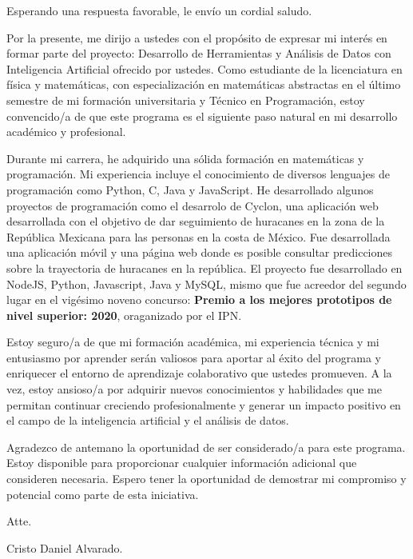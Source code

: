 \documentclass[11pt,a4paper,sans]{moderncv}        %
\begin{document}
\date{1 de enero de 2025}
\opening{}
\closing{Esperando una respuesta favorable, le envío un cordial saludo.}

\makelettertitle

\justifying

Por la presente, me dirijo a ustedes con el propósito de expresar mi interés en formar parte del proyecto: Desarrollo de Herramientas y Análisis de Datos con Inteligencia Artificial ofrecido por ustedes. Como estudiante de la licenciatura en física y matemáticas, con especialización en matemáticas abstractas en el último semestre de mi formación universitaria y Técnico en Programación, estoy convencido/a de que este programa es el siguiente paso natural en mi desarrollo académico y profesional.

Durante mi carrera, he adquirido una sólida formación en matemáticas y programación. Mi experiencia incluye el conocimiento de diversos lenguajes de programación como Python, C, Java y JavaScript. He desarrollado algunos proyectos de programación como el desarrolo de Cyclon, una aplicación web desarrollada con el objetivo de dar seguimiento de huracanes en la zona de la República Mexicana para las personas en la costa de México. Fue desarrollada una aplicación móvil y una página web donde es posible consultar predicciones sobre la trayectoria de huracanes en la república. El proyecto fue
desarrollado en NodeJS, Python, Javascript, Java y MySQL, mismo que fue acreedor del segundo lugar en el vigésimo noveno concurso: \textbf{Premio a los mejores prototipos de nivel superior: 2020}, oraganizado por el IPN.

Estoy seguro/a de que mi formación académica, mi experiencia técnica y mi entusiasmo por aprender serán valiosos para aportar al éxito del programa y enriquecer el entorno de aprendizaje colaborativo que ustedes promueven. A la vez, estoy ansioso/a por adquirir nuevos conocimientos y habilidades que me permitan continuar creciendo profesionalmente y generar un impacto positivo en el campo de la inteligencia artificial y el análisis de datos.

Agradezco de antemano la oportunidad de ser considerado/a para este programa. Estoy disponible para proporcionar cualquier información adicional que consideren necesaria. Espero tener la oportunidad de demostrar mi compromiso y potencial como parte de esta iniciativa.

Atte.

Cristo Daniel Alvarado.
\end{document}
